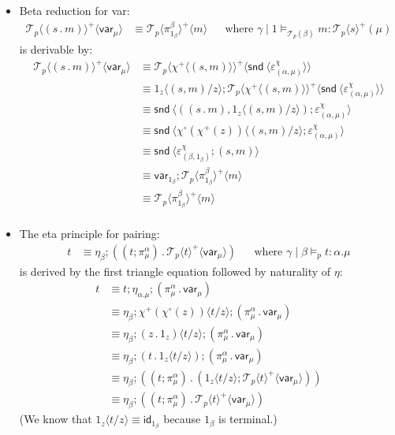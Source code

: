 \documentclass[10pt]{article}
\theoremstyle{definition}
\newcommand\dsd[1]{\ensuremath{\mathsf{#1}}}
\newcommand\TermTwoT[5]{\ensuremath{#1 \mid #3 \vDash_{#5} #2 : #4}}
\newcommand\TrPlus[2]{\ensuremath{{#1}^+(#2)}}
\newcommand\TrCirc[2]{\ensuremath{{#1}^\circ(#2)}}
\newcommand\var[1]{\ensuremath{\mathsf{var}_{#1}}}
\newcommand{\id}{\mathsf{id}}
\newcommand\El[2]{\mathcal{T}_{#1}(#2)}
\newcommand\ApEl[2]{\mathcal{T}_{#1}\langle#2\rangle}
\newcommand\ap[2]{\ensuremath{#1 \langle #2 \rangle }}
\newcommand{\app}[2]{\ensuremath{#1 \: #2}}
\newcommand{\snd}[1]{\app{\dsd{snd}}{#1}}
\newcommand\bdot[0]{\mathbin{.}}
\begin{document}
\begin{itemize}
\item Beta reduction for var:
\begin{align}
\label{beta-var}
\ap{\ApEl{p}{(s \bdot m)}^+}{\var{\mu}} &\equiv \ap{\ApEl{p}{\pi^\beta_{1_\beta}}^+}{m}  && \text{where } \TermTwoT{\gamma}{m}{1}{\ApEl{p}{s}^+(\mu)}{\El{p}{\beta}}
\end{align}
is derivable by:
\begin{align*}
\ap{\ApEl{p}{(s \bdot m)}^+}{\var{\mu}} 
&\equiv \ap{\ApEl{p}{\ap{\chi^+}{(s, m)}}^+}{\ap \snd {\varepsilon^\chi_{(\alpha, \mu)}}} \\
&\equiv \ap{1_z}{(s, m)/z};\ap{\ApEl{p}{\ap{\chi^+}{(s, m)}}^+}{\ap \snd {\varepsilon^\chi_{(\alpha, \mu)}}} \\
&\equiv \ap \snd {((s \bdot m), \ap{1_z}{(s, m)/z});\varepsilon^\chi_{(\alpha, \mu)}} \\
&\equiv \ap \snd {\ap{\TrCirc{\chi}{\TrPlus{\chi}{z}}}{(s, m)/z};\varepsilon^\chi_{(\alpha, \mu)}} \\
&\equiv \ap \snd {\varepsilon^\chi_{(\beta, 1_\beta)};(s, m)} \\
&\equiv \var{1_\beta}; \ap{\ApEl{p}{\pi^\beta_{1_\beta}}^+}{m} \\
&\equiv \ap{\ApEl{p}{\pi^\beta_{1_\beta}}^+}{m} \\
\end{align*}

\item The eta principle for pairing:
\begin{align}
\label{eta-pi-var}
t &\equiv \eta_\beta;((t;\pi^\alpha_\mu) \bdot \ap{\ApEl{p}{t}^+}{\var{\mu}}) && \text{where } \TermTwoT{\gamma}{t}{\beta}{\alpha.\mu}{p}
\end{align}
is derived by the first triangle equation followed by naturality of $\eta$:
\begin{align*}
t &\equiv t;\eta_{\alpha.\mu};(\pi_\mu^\alpha \bdot \var{\mu}) \\
&\equiv \eta_\beta;\ap{\TrPlus{\chi}{\TrCirc{\chi}{z}}}{t/z};(\pi_\mu^\alpha \bdot \var{\mu}) \\
&\equiv \eta_\beta;\ap{(z \bdot 1_z)}{t/z};(\pi_\mu^\alpha \bdot \var{\mu}) \\
&\equiv \eta_\beta;(t \bdot \ap{1_z}{t/z});(\pi_\mu^\alpha \bdot \var{\mu}) \\
&\equiv \eta_\beta;((t;\pi_\mu^\alpha) \bdot (\ap{1_z}{t/z}; \ap{\ApEl{p}{t}^+}{\var{\mu}})) \\
&\equiv \eta_\beta;((t;\pi_\mu^\alpha) \bdot \ap{\ApEl{p}{t}^+}{\var{\mu}})
\end{align*}
(We know that $\ap{1_z}{t/z} \equiv \id_{1_\beta}$ because $1_\beta$ is terminal.)
\end{itemize}
\end{document}

